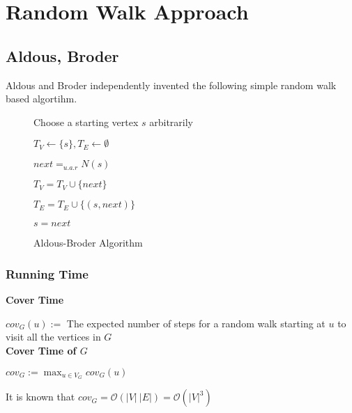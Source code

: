 
\chapter{Random Walk Approach} %

\label{Chapter3} %

\section{Aldous, Broder}

Aldous \cite{aldous1990random} and Broder \cite{63516} independently invented the following simple random walk based algortihm.


\begin{figure}[h!]
\begin{algorithm}[H]
 
 Choose a starting vertex $s$ arbitrarily
 
 $T_V \leftarrow \{s\}, T_E \leftarrow \emptyset$
 
  {
 
    $next =_{u.a.r} N(s)$
    
     {
        $T_V = T_V \cup \{next\}$
        
        $T_E = T_E \cup \{(s, next)\}$
    }
    
    $s = next$
 
 }
 

 
  \caption{Aldous-Broder Algorithm}
\end{algorithm}
\end{figure} 

\subsection{Running Time}


\textbf{Cover Time}

$cov_G(u) := $ The expected number of steps for a random walk starting at $u$ to visit all the vertices in $G$ \\


\textbf{Cover Time of $G$} 

$cov_G := \max_{u \in V_G} cov_G(u)$  


It is known that $cov_G = \mathcal{O}(|V|\ |E|) = \mathcal{O}(|V|^3)$


